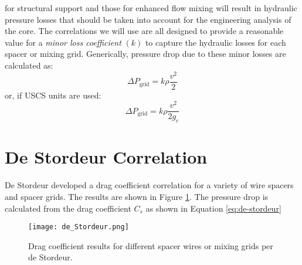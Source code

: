  for structural support and those for enhanced flow mixing will result in hydraulic pressure losses that should be taken into account for the engineering analysis of the core.  The correlations we will use are all designed to provide a reasonable value for a \emph{minor loss coefficient} $(k)$ to capture the hydraulic losses for each spacer or mixing grid.  Generically, pressure drop due to these minor losses are calculated as:
$$\Delta P_{\text{grid}}=k\rho \frac{v^2}{2}$$
or, if USCS units are used:
$$\Delta P_{\text{grid}}=k \rho \frac{v^{2}}{2 g_{c}}$$

\section{De Stordeur Correlation} 
De Stordeur developed a drag coefficient correlation for a variety of wire spacers and spacer grids.\cite{de1961drag} The results are shown in Figure \ref{fig:de_stordeur}.  The pressure drop is calculated from the drag coefficient $C_s$ as shown in Equation \ref{eq:de-stordeur}

\begin{figure}
\texttt{[image: de\_Stordeur.png]}
\caption{Drag coefficient results for different spacer wires or mixing grids per de Stordeur.}
\label{fig:de_stordeur}
\end{figure}


